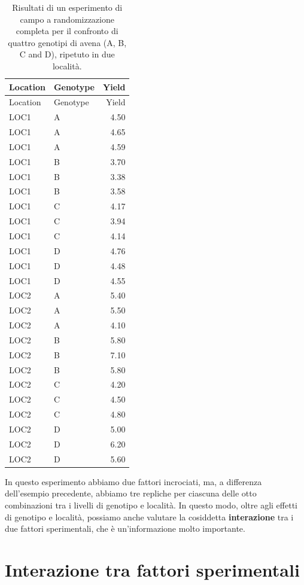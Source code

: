 \documentclass[
  12pt,
]{book}
\begin{document}
\begin{longtable}[]{@{}llr@{}}
\caption{\label{tab:tabName4b4}Risultati di un esperimento di campo a randomizzazione completa per il confronto di quattro genotipi di avena (A, B, C and D), ripetuto in due località.}\tabularnewline
\toprule()
Location & Genotype & Yield \\
\midrule()
\endfirsthead
\toprule()
Location & Genotype & Yield \\
\midrule()
\endhead
LOC1 & A & 4.50 \\
LOC1 & A & 4.65 \\
LOC1 & A & 4.59 \\
LOC1 & B & 3.70 \\
LOC1 & B & 3.38 \\
LOC1 & B & 3.58 \\
LOC1 & C & 4.17 \\
LOC1 & C & 3.94 \\
LOC1 & C & 4.14 \\
LOC1 & D & 4.76 \\
LOC1 & D & 4.48 \\
LOC1 & D & 4.55 \\
LOC2 & A & 5.40 \\
LOC2 & A & 5.50 \\
LOC2 & A & 4.10 \\
LOC2 & B & 5.80 \\
LOC2 & B & 7.10 \\
LOC2 & B & 5.80 \\
LOC2 & C & 4.20 \\
LOC2 & C & 4.50 \\
LOC2 & C & 4.80 \\
LOC2 & D & 5.00 \\
LOC2 & D & 6.20 \\
LOC2 & D & 5.60 \\
\bottomrule()
\end{longtable}

In questo esperimento abbiamo due fattori incrociati, ma, a differenza dell'esempio precedente, abbiamo tre repliche per ciascuna delle otto combinazioni tra i livelli di genotipo e località. In questo modo, oltre agli effetti di genotipo e località, possiamo anche valutare la cosiddetta \textbf{interazione} tra i due fattori sperimentali, che è un'informazione molto importante.

\hypertarget{interazione-tra-fattori-sperimentali}{%
\section{Interazione tra fattori sperimentali}\label{interazione-tra-fattori-sperimentali}}
\end{document}
